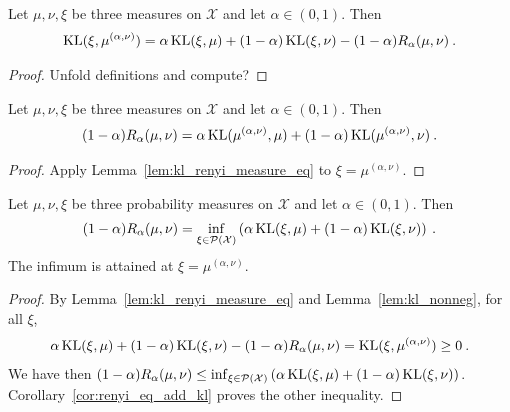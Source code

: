 \begin{lemma}
  \label{lem:kl_renyi_measure_eq}
  Let $\mu, \nu, \xi$ be three measures on $\mathcal X$ and let $\alpha \in (0, 1)$. Then
  \begin{align*}
  \operatorname{KL}(\xi, \mu^{(\alpha, \nu)}) = \alpha \operatorname{KL}(\xi, \mu) + (1 - \alpha)\operatorname{KL}(\xi, \nu) - (1 - \alpha) R_\alpha(\mu, \nu) \: .
  \end{align*}
\end{lemma}

\begin{proof}
Unfold definitions and compute?
\end{proof}

\begin{corollary}
  \label{cor:renyi_eq_add_kl}
  Let $\mu, \nu, \xi$ be three measures on $\mathcal X$ and let $\alpha \in (0, 1)$. Then
  \begin{align*}
  (1 - \alpha) R_\alpha(\mu, \nu) = \alpha \operatorname{KL}(\mu^{(\alpha, \nu)}, \mu) + (1 - \alpha)\operatorname{KL}(\mu^{(\alpha, \nu)}, \nu) \: .
  \end{align*}
\end{corollary}

\begin{proof}
Apply Lemma~\ref{lem:kl_renyi_measure_eq} to $\xi = \mu^{(\alpha, \nu)}$.
\end{proof}

\begin{lemma}
  \label{lem:renyi_eq_inf_add_kl}
  Let $\mu, \nu, \xi$ be three probability measures on $\mathcal X$ and let $\alpha \in (0, 1)$. Then
  \begin{align*}
  (1 - \alpha) R_\alpha(\mu, \nu) = \inf_{\xi \in \mathcal P(\mathcal X)}\left( \alpha \operatorname{KL}(\xi, \mu) + (1 - \alpha)\operatorname{KL}(\xi, \nu) \right) \: .
  \end{align*}
  The infimum is attained at $\xi = \mu^{(\alpha, \nu)}$.
\end{lemma}

\begin{proof}
By Lemma~\ref{lem:kl_renyi_measure_eq} and Lemma~\ref{lem:kl_nonneg}, for all $\xi$,
\begin{align*}
\alpha \operatorname{KL}(\xi, \mu) + (1 - \alpha)\operatorname{KL}(\xi, \nu) - (1 - \alpha) R_\alpha(\mu, \nu)
= \operatorname{KL}(\xi, \mu^{(\alpha, \nu)})
\ge 0 \: .
\end{align*}
We have then $(1 - \alpha) R_\alpha(\mu, \nu) \le \inf_{\xi \in \mathcal P(\mathcal X)}\left( \alpha \operatorname{KL}(\xi, \mu) + (1 - \alpha)\operatorname{KL}(\xi, \nu) \right)$.
Corollary~\ref{cor:renyi_eq_add_kl} proves the other inequality.
\end{proof}

